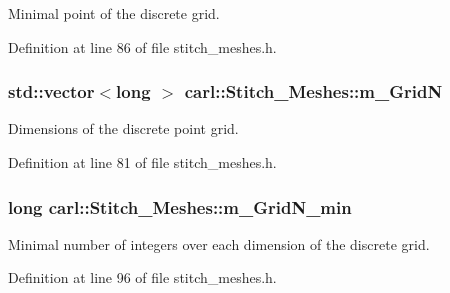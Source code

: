 Minimal point of the discrete grid. 



Definition at line 86 of file stitch\+\_\+meshes.\+h.

\hypertarget{classcarl_1_1_stitch___meshes_a4213e0cfdaf9554971d75c6b811f4bdd}{}
\subsubsection[{m\+\_\+\+Grid\+N}]{\setlength{\rightskip}{0pt plus 5cm}std\+::vector$<$long $>$ carl\+::\+Stitch\+\_\+\+Meshes\+::m\+\_\+\+Grid\+N\hspace{0.3cm}{\ttfamily [protected]}}\label{classcarl_1_1_stitch___meshes_a4213e0cfdaf9554971d75c6b811f4bdd}


Dimensions of the discrete point grid. 



Definition at line 81 of file stitch\+\_\+meshes.\+h.

\hypertarget{classcarl_1_1_stitch___meshes_a573f149c7418656a45be9613d3183b5e}{}
\subsubsection[{m\+\_\+\+Grid\+N\+\_\+min}]{\setlength{\rightskip}{0pt plus 5cm}long carl\+::\+Stitch\+\_\+\+Meshes\+::m\+\_\+\+Grid\+N\+\_\+min\hspace{0.3cm}{\ttfamily [protected]}}\label{classcarl_1_1_stitch___meshes_a573f149c7418656a45be9613d3183b5e}


Minimal number of integers over each dimension of the discrete grid. 



Definition at line 96 of file stitch\+\_\+meshes.\+h.

\hypertarget{classcarl_1_1_stitch___meshes_a5548b4e0628dcdcb5b1c08eeec124c39}{}
